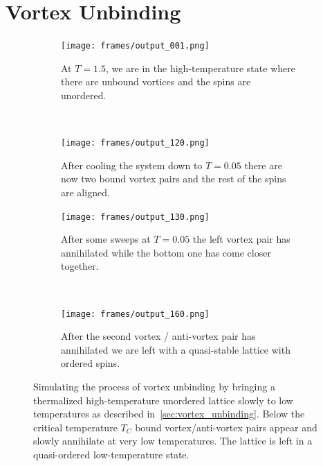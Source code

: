 \section{Vortex Unbinding}\label{app:vortex_unbinding}
\begin{figure}[H]
	\centering
	\begin{subfigure}[h]{0.45\textwidth}
		\centering
		\texttt{[image: frames/output\_001.png]}
		\caption{At $T=\num{1.5}$, we are in the high-temperature state where there are unbound vortices and the spins are unordered.}
	\end{subfigure}
	~
	\begin{subfigure}[h]{0.45\textwidth}
		\centering
		\texttt{[image: frames/output\_120.png]}
		\caption{After cooling the system down to $T=\num{0.05}$ there are now two bound vortex pairs and the rest of the spins are aligned.}
	\end{subfigure}
	\begin{subfigure}[h]{0.45\textwidth}
		\centering
		\texttt{[image: frames/output\_130.png]}
		\caption{After some sweeps at $T=\num{0.05}$ the left vortex pair has annihilated while the bottom one has come closer together.}
	\end{subfigure}
	~
	\begin{subfigure}[h]{0.45\textwidth}
		\centering
		\texttt{[image: frames/output\_160.png]}
		\caption{After the second vortex / anti-vortex pair has annihilated we are left with a quasi-stable lattice with ordered spins.}
	\end{subfigure}
	\caption[Vortex unbinding of vortex/antivortex pairs at low temperatures]{Simulating the process of vortex unbinding by bringing a thermalized high-temperature unordered lattice slowly to low temperatures as described in~\cref{sec:vortex_unbinding}. Below the critical temperature $T_C$ bound vortex/anti-vortex pairs appear and slowly annihilate at very low temperatures. The lattice is left in a quasi-ordered low-temperature state.}
	\label{fig:vortex_unbinding}
\end{figure}